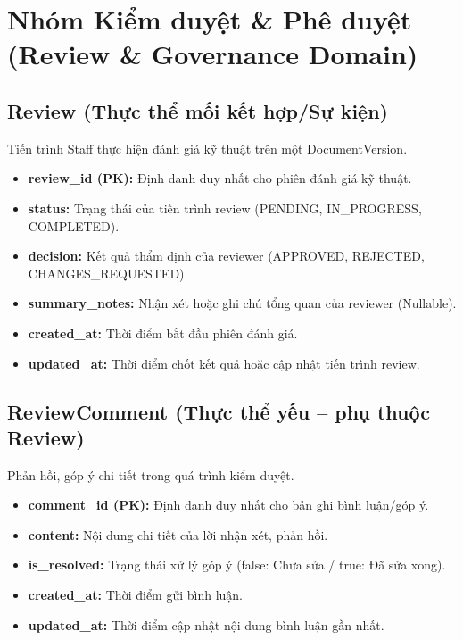 \section{Nhóm Kiểm duyệt \& Phê duyệt (Review \& Governance Domain)}

\subsection{Review (Thực thể mối kết hợp/Sự kiện)}

Tiến trình Staff thực hiện đánh giá kỹ thuật trên một DocumentVersion.

\begin{itemize}
    \item \textbf{review\_id (PK):} Định danh duy nhất cho phiên đánh giá kỹ thuật.
    \item \textbf{status:} Trạng thái của tiến trình review (PENDING, IN\_PROGRESS, COMPLETED).
    \item \textbf{decision:} Kết quả thẩm định của reviewer (APPROVED, REJECTED, CHANGES\_REQUESTED).
    \item \textbf{summary\_notes:} Nhận xét hoặc ghi chú tổng quan của reviewer (Nullable).
    \item \textbf{created\_at:} Thời điểm bắt đầu phiên đánh giá.
    \item \textbf{updated\_at:} Thời điểm chốt kết quả hoặc cập nhật tiến trình review.
\end{itemize}


\subsection{ReviewComment (Thực thể yếu -- phụ thuộc Review)}

Phản hồi, góp ý chi tiết trong quá trình kiểm duyệt.

\begin{itemize}
    \item \textbf{comment\_id (PK):} Định danh duy nhất cho bản ghi bình luận/góp ý.
    \item \textbf{content:} Nội dung chi tiết của lời nhận xét, phản hồi.
    \item \textbf{is\_resolved:} Trạng thái xử lý góp ý (false: Chưa sửa / true: Đã sửa xong).
    \item \textbf{created\_at:} Thời điểm gửi bình luận.
    \item \textbf{updated\_at:} Thời điểm cập nhật nội dung bình luận gần nhất.
\end{itemize}


